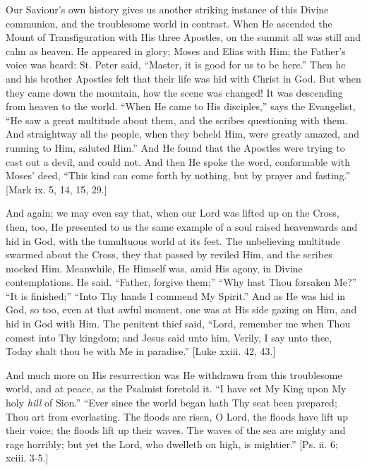 Our Saviour's own history gives us another striking instance of
this Divine communion, and the troublesome world in contrast. When He
ascended the Mount of Transfiguration with His three Apostles, on the
summit all was still and calm as heaven. He appeared in glory; Moses
and Elias with Him; the Father's voice was heard: St. Peter said,
``Master, it is good for us to be here.'' Then he and his
brother Apostles felt that their life was hid with Christ in God. But
when they came down the mountain, how the scene was changed! It was
descending from heaven to the world. ``When He came to His
disciples,'' says the Evangelist, ``He saw a great multitude
about them, and the scribes questioning with them. And straightway all
the people, when they beheld Him, were greatly amazed, and running to
Him, saluted Him.'' And He found that the Apostles were trying to
cast out a devil, and could not. And then He spoke the word,
conformable with Moses' deed, ``This kind can come forth by
nothing, but by prayer and fasting.'' [Mark ix. 5, 14, 15, 29.]

And again; we may even say that, when our Lord was lifted up on the
Cross, then, too, He presented to us the same example of a soul raised
heavenwards and hid in God, with the tumultuous world at its feet. The
unbelieving multitude swarmed about the Cross, they that passed by
reviled Him, and the scribes mocked Him. Meanwhile, He Himself was,
amid His agony, in Divine contemplations. He said. ``Father,
forgive them;'' ``Why hast Thou forsaken Me?'' ``It is
finished;'' ``Into Thy hands I commend My Spirit.'' And as
He was hid in God, so too, even at that awful moment, one was at His
side gazing on Him, and hid in God with Him. The penitent thief said,
``Lord, remember me when Thou comest into Thy kingdom; and Jesus
said unto him, Verily, I say unto thee, Today shalt thou be with Me in
paradise.'' [Luke xxiii. 42, 43.]

And much more on His resurrection was He withdrawn from this
troublesome world, and at peace, as the Psalmist foretold it. ``I
have set My King upon My holy \emph{hill} of Sion.'' ``Ever
since the world began hath Thy seat been prepared; Thou art from
everlasting. The floods are risen, O Lord, the floods have lift up
their voice; the floods lift up their waves. The waves of the sea are
mighty and rage horribly; but yet the Lord, who dwelleth on high, is
mightier.'' [Ps. ii. 6; xciii. 3-5.]

